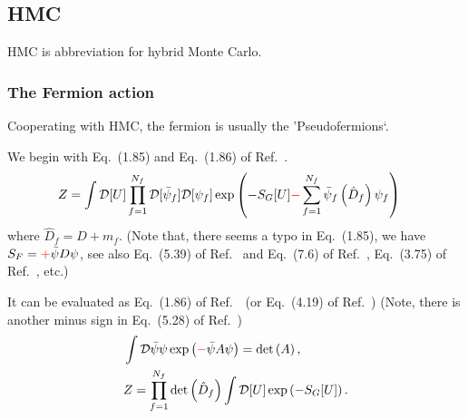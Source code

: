 \subsection{\label{hmc}HMC}

HMC is abbreviation for hybrid Monte Carlo.

\subsubsection{\label{hmc_scheme}The Fermion action}

Cooperating with HMC, the fermion is usually the 'Pseudofermions`.

We begin with Eq.~(1.85) and Eq.~(1.86) of Ref.~\cite{latticeqcdbook2017}.
\begin{equation}
\begin{split}
&Z=\int \mathcal{D}[U] \prod _{f=1}^{N_f} \mathcal {D}[\bar{\psi}_f]\mathcal {D}[\psi _f]\exp \left(-S_G[U]\textcolor[rgb]{1,0,0}{-}\sum _{f=1}^{N_f}\bar{\psi} _f\left(\hat{D}_f\right)\psi _f\right)
\end{split}
\end{equation}
where $\hat{D}_f=D+m_f$. (Note that, there seems a typo in Eq.~(1.85), we have $S_F=\textcolor[rgb]{1,0,0}{+}\bar{\psi}D\psi$, see also Eq.~(5.39) of Ref.~\cite{latticeqcdbook2010} and Eq.~(7.6) of Ref.~\cite{latticeqcdbook1998}, Eq.~(3.75) of Ref.~\cite{latticeqcdbook2017}, etc.)

It can be evaluated as Eq.~(1.86) of Ref.~\cite{latticeqcdbook2017}~(or Eq.~(4.19) of Ref.~\cite{condensedmatterbookAltland}) (Note, there is another minus sign in Eq.~(5.28) of Ref.~\cite{latticeqcdbook2010})
\begin{equation}
\begin{split}
&\int \mathcal{D}{\bar{\psi}}\psi \exp \left(\textcolor[rgb]{1,0,0}{-}\bar{\psi}A\psi\right)=\det \left(A\right),\\
&Z=\prod _{f=1}^{N_f} \det \left(\hat{D}_f\right)\int \mathcal{D}[U] \exp \left(-S_G[U]\right).\\
\end{split}
\end{equation}

